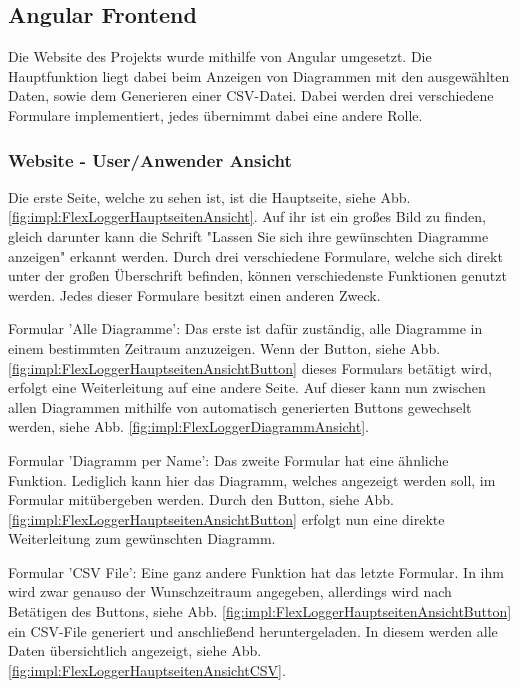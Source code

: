 \subsection{Angular Frontend}
Die Website des Projekts wurde mithilfe von Angular umgesetzt. Die Hauptfunktion liegt dabei beim Anzeigen von Diagrammen mit den ausgewählten Daten, sowie dem Generieren einer CSV-Datei. Dabei werden drei verschiedene Formulare implementiert, jedes übernimmt dabei eine andere Rolle.
 
 
\subsubsection{Website - User/Anwender Ansicht}
Die erste Seite, welche zu sehen ist, ist die Hauptseite, siehe Abb. \ref{fig:impl:FlexLoggerHauptseitenAnsicht}. Auf ihr ist ein großes Bild zu finden, gleich darunter kann die Schrift "Lassen Sie sich ihre gewünschten Diagramme anzeigen" erkannt werden.
Durch drei verschiedene Formulare, welche sich direkt unter der großen Überschrift befinden, können verschiedenste Funktionen genutzt werden. Jedes dieser Formulare besitzt einen anderen Zweck.

\begin{compactitem}
    \item Formular 'Alle Diagramme': Das erste ist dafür zuständig, alle Diagramme in einem bestimmten Zeitraum anzuzeigen. Wenn der Button, siehe Abb. \ref{fig:impl:FlexLoggerHauptseitenAnsichtButton} dieses Formulars betätigt wird, erfolgt eine Weiterleitung auf eine andere Seite. Auf dieser kann nun zwischen allen Diagrammen mithilfe von automatisch generierten Buttons gewechselt werden, siehe Abb. \ref{fig:impl:FlexLoggerDiagrammAnsicht}.
    \item Formular 'Diagramm per Name': Das zweite Formular hat eine ähnliche Funktion. Lediglich kann hier das Diagramm, welches angezeigt werden soll, im Formular mitübergeben werden. Durch den Button, siehe Abb. \ref{fig:impl:FlexLoggerHauptseitenAnsichtButton} erfolgt nun eine direkte Weiterleitung zum gewünschten Diagramm.
    \item Formular 'CSV File': Eine ganz andere Funktion hat das letzte Formular. In ihm wird zwar genauso der Wunschzeitraum angegeben, allerdings wird nach Betätigen des Buttons, siehe Abb. \ref{fig:impl:FlexLoggerHauptseitenAnsichtButton} ein CSV-File generiert und anschließend heruntergeladen. In diesem werden alle Daten übersichtlich angezeigt, siehe Abb. \ref{fig:impl:FlexLoggerHauptseitenAnsichtCSV}.
\end{compactitem}

